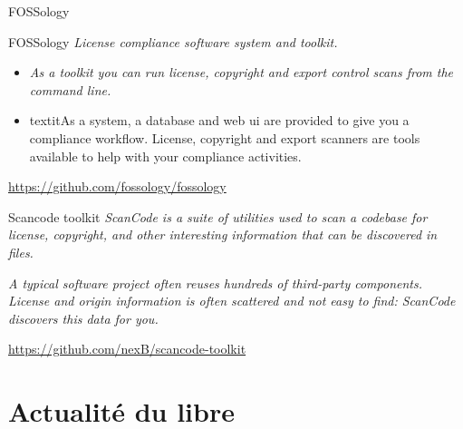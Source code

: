 \documentclass{beamer}
\begin{document}


\begin{frame}{FOSSology}
\begin{block}{FOSSology}
\textit{License compliance software system and toolkit.}
\end{block}
\begin{itemize}
\item \textit{As a toolkit you can run license, copyright and export control scans from the command line.}
\item textit{As a system, a database and web ui are provided to give you a compliance workflow. License, copyright and export scanners are tools available to help with your compliance activities.}
\end{itemize}
\url{https://github.com/fossology/fossology}
\end{frame}


\begin{frame}[plain]%
%  
\end{frame}



\begin{frame}{Scancode toolkit}
\textit{ ScanCode is a suite of utilities used to scan a codebase for license, copyright, and other interesting information that can be discovered in files.}

\textit{A typical software project often reuses hundreds of third-party components. License and origin information is often scattered and not easy to find: ScanCode discovers this data for you.}

\url{https://github.com/nexB/scancode-toolkit}
\end{frame}

\begin{frame}[plain]%
%  
\end{frame}



\section{Actualité du libre}
\end{document}
